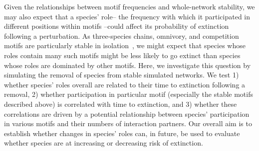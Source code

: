 \documentclass[12pt]{article}
\begin{document}
	Given the relationships between motif frequencies and whole-network stability, we may also expect that a species' role-- the frequency with which it participated in different positions within motifs --could affect its probability of extinction following a perturbation. As three-species chains, omnivory, and competition motifs are particularly stable in isolation~\citep{Borrelli2015a}, we might expect that species whose roles contain many such motifs might be less likely to go extinct than species whose roles are dominated by other motifs. Here, we investigate this question by simulating the removal of species from stable simulated networks. We test 1) whether species' roles overall are related to their time to extinction following a removal, 2) whether participation in particular motif (especially the stable motifs described above) is correlated with time to extinction, and 3) whether these correlations are driven by a potential relationship between species' participation in various motifs and their numbers of interaction partners. Our overall aim is to establish whether changes in species' roles can, in future, be used to evaluate whether species are at increasing or decreasing risk of extinction.


\end{document}

